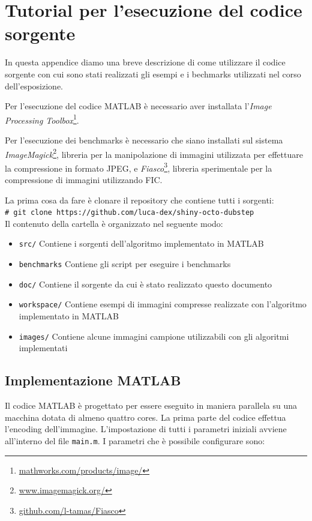 \documentclass[11pt,a4paper,appendixprefix=true,numbers=noenddot]{scrreprt}
\newcommand{\shellcmd}[1]{\\\indent\indent\texttt{\footnotesize\# #1}\\}
\begin{document}
\appendix

\chapter{Tutorial per l'esecuzione del codice sorgente}

In questa appendice diamo una breve descrizione di come utilizzare il codice sorgente con cui sono stati realizzati gli esempi e i bechmarks utilizzati nel corso dell'esposizione. 

Per l'esecuzione del codice MATLAB è necessario aver installata l'\textit{Image Processing Toolbox}\footnote{\url{mathworks.com/products/image/}}.

Per l'esecuzione dei benchmarks è necessario che siano installati sul sistema \textit{ImageMagick}\footnote{\url{www.imagemagick.org/}}, libreria per la manipolazione di immagini utilizzata per effettuare la compressione in formato JPEG, e \textit{Fiasco}\footnote{\url{github.com/l-tamas/Fiasco}}, libreria sperimentale per la compressione di immagini utilizzando FIC.

\noindent La prima cosa da fare è clonare il repository che contiene tutti i sorgenti:
\shellcmd{git clone https://github.com/luca-dex/shiny-octo-dubstep}

Il contenuto della cartella è organizzato nel seguente modo:

\begin{itemize}
\item \texttt{src/} Contiene i sorgenti dell'algoritmo implementato in MATLAB
\item \texttt{benchmarks} Contiene gli script per eseguire i benchmarks
\item \texttt{doc/} Contiene il sorgente da cui è stato realizzato questo documento
\item \texttt{workspace/} Contiene esempi di immagini compresse realizzate con l'algoritmo implementato in MATLAB
\item \texttt{images/} Contiene alcune immagini campione utilizzabili con gli algoritmi implementati
\end{itemize}

\section{Implementazione MATLAB}

Il codice MATLAB è progettato per essere eseguito in maniera parallela su una macchina dotata di almeno quattro cores. La prima parte del codice effettua l'encoding dell'immagine. L'impostazione di tutti i parametri iniziali avviene all'interno del file \texttt{main.m}. I parametri che è possibile configurare sono:
\end{document}
